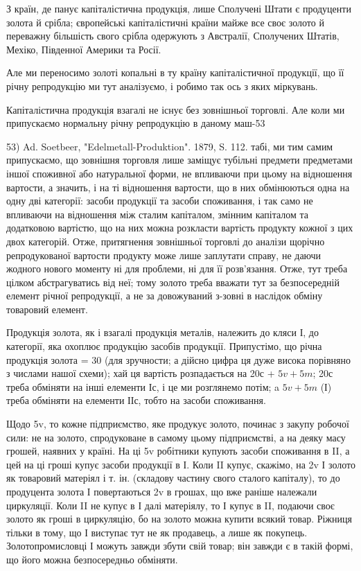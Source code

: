 З країн, де панує капіталістична продукція, лише Сполучені Штати
є продуценти золота й срібла; європейські капіталістичні країни майже
все своє золото й переважну більшість свого срібла одержують з
Австралії, Сполучених Штатів, Мехіко, Південної Америки та Росії.

Але ми переносимо золоті копальні в ту країну капіталістичної продукції,
що її річну репродукцію ми тут аналізуємо, і робимо так ось з
яких міркувань.

Капіталістична продукція взагалі не існує без зовнішньої торговлі.
Але коли ми припускаємо нормальну річну репродукцію в даному маш-53

53) Ad. Soetbeer, "Edelmetall-Produktion". 1879, S. 112.
табі, ми тим самим припускаємо, що зовнішня торговля лише заміщує
тубільні предмети предметами іншої споживної або натуральної форми, не
впливаючи при цьому на відношення вартости, а значить, і на ті відношення
вартости, що в них обмінюються одна на одну дві категорії:
засоби продукції та засоби споживання, і так само не впливаючи на
відношення між сталим капіталом, змінним капіталом та додатковою
вартістю, що на них можна розкласти вартість продукту кожної з цих
двох категорій. Отже, притягнення зовнішньої торговлі до аналізи щорічно
репродукованої вартости продукту може лише заплутати справу, не даючи
жодного нового моменту ні для проблеми, ні для її розв’язання. Отже,
тут треба цілком абстрагуватись від неї; тому золото треба вважати тут
за безпосередній елемент річної репродукції, а не за довожуваний з-зовні
в наслідок обміну товаровий елемент.

Продукція золота, як і взагалі продукція металів, належить до кляси І,
до категорії, яка охоплює продукцію засобів продукції. Припустімо, що
річна продукція золота = 30 (для зручности; а дійсно цифра ця дуже
висока порівняно з числами нашої схеми); хай ця вартість розпадається
на 20с + $5v + 5m$; 20с треба обміняти на інші елементи Іс, і це ми розглянемо
потім; a $5v + 5m$ (І) треба обміняти на елементи ІІс, тобто на
засоби споживання.

Щодо 5v, то кожне підприємство, яке продукує золото, починає з
закупу робочої сили: не на золото, спродуковане в самому цьому підприємстві,
а на деяку масу грошей, наявних у країні. На ці 5v робітники
купують засоби споживання в II, а цей на ці гроші купує засоби продукції
в І. Коли II купує, скажімо, на 2v І золото як товаровий
матеріял і т. ін. (складову частину свого сталого капіталу), то до продуцента
золота І повертаються 2v в грошах, що вже раніше належали
циркуляції. Коли II не купує в І далі матеріялу, то І купує в II, подаючи
своє золото як гроші в циркуляцію, бо на золото можна купити всякий
товар. Ріжниця тільки в тому, що І виступає тут не як продавець, а
лише як покупець. Золотопромисловці І можуть завжди збути свій товар;
він завжди є в такій формі, що його можна безпосередньо обміняти.

